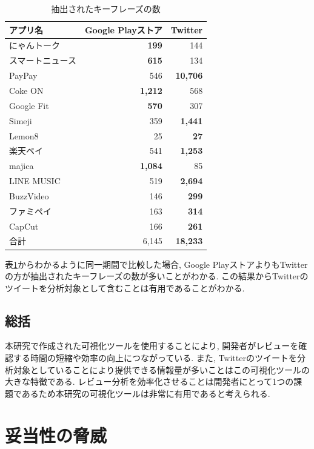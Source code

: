 \begin{table}[H]
  \small
  \caption{抽出されたキーフレーズの数}
  \label{tb:app_count}
  \begin{center}
  \begin{tabularx}{\linewidth}{X|r|r}
    \hline
    アプリ名&Google Playストア&Twitter\\\hline\hline
    にゃんトーク&\textbf{199}&144\\\hline
    スマートニュース&\textbf{615}&134\\\hline
    PayPay&546&\textbf{10,706}\\\hline
    Coke ON&\textbf{1,212}&568\\\hline
    Google Fit&\textbf{570}&307\\\hline
    Simeji&359&\textbf{1,441}\\\hline
    Lemon8&25&\textbf{27}\\\hline
    楽天ペイ&541&\textbf{1,253}\\\hline
    majica&\textbf{1,084}&85\\\hline
    LINE MUSIC&519&\textbf{2,694}\\\hline
    BuzzVideo&146&\textbf{299}\\\hline
    ファミペイ&163&\textbf{314}\\\hline
    CapCut&166&\textbf{261}\\\hline\hline
    合計&6,145&\textbf{18,233}\\\hline
  \end{tabularx}\end{center}
\end{table}

\noindent
表\ref{tb:app_count}からわかるように同一期間で比較した場合, Google PlayストアよりもTwitterの方が抽出されたキーフレーズの数が多いことがわかる. 
この結果からTwitterのツイートを分析対象として含むことは有用であることがわかる. 

\subsection{総括}
本研究で作成された可視化ツールを使用することにより, 開発者がレビューを確認する時間の短縮や効率の向上につながっている. また, Twitterのツイートを分析対象としていることにより提供できる情報量が多いことはこの可視化ツールの大きな特徴である. レビュー分析を効率化させることは開発者にとって1つの課題であるため本研究の可視化ツールは非常に有用であると考えられる. 

\section{妥当性の脅威}
